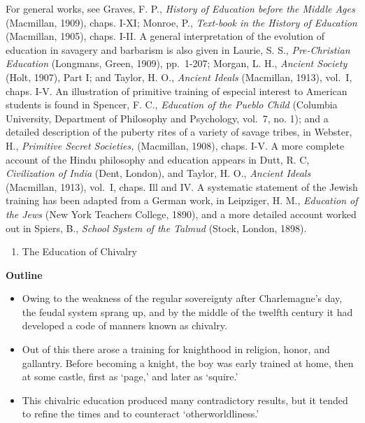 \documentclass[]{book}
\providecommand{\tightlist}{%
  \setlength{\itemsep}{0pt}\setlength{\parskip}{0pt}}
\begin{document}
For general works, see Graves, F. P., \emph{History of Education before the Middle Ages} (Macmillan, 1909), chaps. I-XI; Monroe, P., \emph{Text-book in the History of Education} (Macmillan, 1905), chaps. I-II. A general interpretation of the evolution of education in savagery and barbarism is also given in Laurie, S. S., \emph{Pre-Christian Education} (Longmans, Green, 1909), pp.~1-207; Morgan, L. H., \emph{Ancient Society} (Holt, 1907), Part I; and Taylor, H. O., \emph{Ancient Ideals} (Macmillan, 1913), vol.~I, chaps. I-V. An illustration of primitive training of especial interest to American students is found in Spencer, F. C., \emph{Education of the Pueblo Child} (Columbia University, Department of Philosophy and Psychology, vol.~7, no. 1); and a detailed description of the puberty rites of a variety of savage tribes, in Webster, H., \emph{Primitive Secret Societies,} (Macmillan, 1908), chaps. I-V. A more complete account of the Hindu philosophy and education appears in Dutt, R. C, \emph{Civilization of India} (Dent, London), and Taylor, H. O., \emph{Ancient Ideals} (Macmillan, 1913), vol.~I, chaps. Ill and IV. A systematic statement of the Jewish training has been adapted from a German work, in Leipziger, H. M., \emph{Education of the Jews} (New York Teachers College, 1890), and a more detailed account worked out in Spiers, B., \emph{School System of the Talmud} (Stock, London, 1898).

\begin{enumerate}
\def\labelenumi{\arabic{enumi}.}
\setcounter{enumi}{9}
\tightlist
\item
  The Education of Chivalry
\end{enumerate}

\textbf{Outline}

\begin{itemize}
\tightlist
\item
  Owing to the weakness of the regular sovereignty after Charlemagne's day, the feudal system sprang up, and by the middle of the twelfth century it had developed a code of manners known as chivalry.
\item
  Out of this there arose a training for knighthood in religion, honor, and gallantry. Before becoming a knight, the boy was early trained at home, then at some castle, first as `page,' and later as `squire.'
\item
  This chivalric education produced many contradictory results, but it tended to refine the times and to counteract `otherworldliness.'
\end{itemize}
\end{document}
